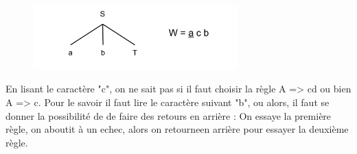 \documentclass{article}
\begin{document}
\begin{figure}[h!]
	\centering
		\includegraphics[width=0.70\textwidth]{AnalyseDescendante4.png}
	\label{fig:AnalyseDescendante4}
\end{figure}\FloatBarrier

En lisant le caractère "c", on ne sait pas si il faut choisir la règle A => cd ou bien A => c.
Pour le savoir il faut lire le caractère suivant "b", ou alors, il faut se donner la possibilité de de faire des retours en arrière :
On essaye la première règle, on aboutit à un echec, alors on retourneen arrière pour essayer la deuxième règle.
\end{document}
